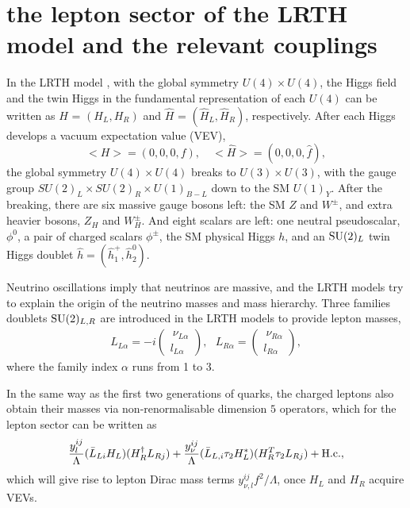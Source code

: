 \documentclass[preprint,aps,12pt,showpacs,nofootinbib,tightenlines]{revtex4}
\begin{document}
\section{the lepton sector of the LRTH model and the relevant couplings}
In the LRTH model \cite{lrth-review,0711.1238,0611015-su}, with the global symmetry $U(4) \times U(4)$,
the Higgs field and the twin Higgs in the fundamental representation of each $U(4)$
 can be written as $H$ = $( H_{L}, H_{R} )$ and $\hat{H}$ = $( \hat{H}_{L},\hat{H}_{R} )$, respectively.
After each Higgs develops a vacuum expectation value (VEV),
\begin{equation}
<H> = (0,0,0,f),\quad <\hat{H}> = (0,0,0,\hat{f}),
 \label{vevs}
\end{equation}
the global symmetry $U(4)\times U(4)$ breaks to $U(3)\times U(3)$, with the gauge group
$ SU(2)_L \times SU(2)_R \times U(1)_{B-L}$ down to the SM $U(1)_Y$.
After the breaking, there are six massive gauge bosons left:
the SM $Z$ and $W^\pm$, and extra heavier bosons, $Z_{H}$ and $W_H^\pm$. And
eight scalars are left: one neutral pseudoscalar, $\phi^0$, a pair of charged
scalars $\phi^\pm$, the SM physical Higgs $h$, and an ${\rm SU}(2)_L$ twin Higgs
doublet $\hat{h}=(\hat{h}_1^+, \hat{h}_2^0)$.

Neutrino oscillations \cite{oscillneutrinos} imply that neutrinos are massive,
and the LRTH models try to explain the origin of the neutrino masses and mass hierarchy.
Three families doublets ${\rm SU}(2)_{L,R}$ are introduced in the LRTH models to provide lepton masses,
\begin{eqnarray}
    L_{L\alpha}=-i\left(\begin{array}{c}~\nu_{L\alpha}
\\l_{L\alpha}\end{array}\right), %
    ~~~L_{R\alpha}=\left(\begin{array}{c}~\nu_{R\alpha}
\\l_{R\alpha}\end{array}\right), %
\end{eqnarray}
where the family index $\alpha$ runs from 1 to 3.

In the same way as the first two generations of quarks, the charged leptons also obtain their masses
via non-renormalisable dimension $5$ operators, which for the lepton sector can be written as
\begin{equation}
{y_l^{ij}\over \Lambda} (\bar{L}_{Li} H_L)(H_R^{\dagger}{L}_{Rj})+{y_{\nu}^{ij}\over \Lambda}
(\bar{L}_{L,i}\tau_2 H_L^*)(H_R^T\tau_2{L}_{Rj}) + {\rm {H.c.}} ,
\label{eq:Yukawalep}
\end{equation}
which will give rise to lepton Dirac mass terms $y_{\nu,l}^{ij} f^2/\Lambda$, once $H_L$ and $H_R$ acquire  VEVs.
\end{document}
